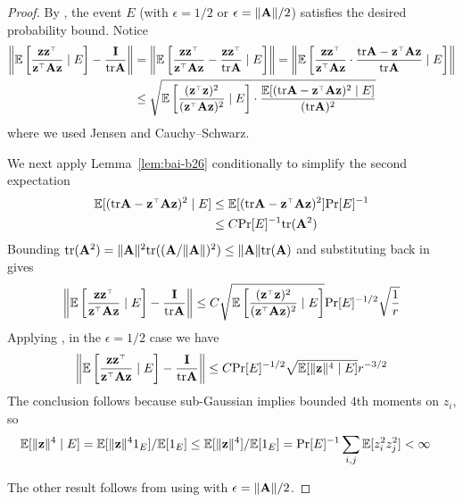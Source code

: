 \begin{proof}
  By , the event $E$
  (with $\epsilon = 1/2$ or $\epsilon = \|\mathbf A\| / 2$) satisfies the desired
  probability bound. Notice
  \begin{align*}
    \left\| \E \left[
      \frac{\z \z^\top}{\z^\top \A \z}
    \mid E \right] - \frac{\I}{\tr \A} \right\|
    &= \left\| \E \left[
      \frac{\z \z^\top}{\z^\top \A \z} - \frac{\z \z^\top}{\tr \A}
    \mid E \right] \right\|
    = \left\| \E \left[
      \frac{\z \z^\top}{\z^\top \A \z} \cdot \frac{ \tr \A - \z^\top \A \z }{\tr \A}
    \mid E \right] \right\| \\
    &\le \sqrt{\E \left[
      \frac{ (\z^\top \z)^2 }{ (\z^\top \A \z)^2 }
  \mid E \right] \cdot \frac{ \E[(\tr \A - \z^\top \A \z)^2 \mid E]}{(\tr \A)^2} } \\
  \end{align*}
  where we used Jensen and Cauchy–Schwarz.

  We next apply Lemma~\ref{lem:bai-b26} conditionally
  to simplify the second expectation
  \begin{align*}
    \E[(\tr \A - \z^\top \A \z)^2  \mid E]
    &\leq \E[(\tr \A - \z^\top \A \z)^2] \Pr[E]^{-1} \\
    &\leq C \Pr[E]^{-1} \tr(\A^2)
  \end{align*}
  Bounding $\mathrm{tr}(\mathbf A^2) = \|\mathbf A\|^2 \mathrm{tr}((\mathbf A / \|\mathbf A\|)^2) \leq \|\mathbf A\| \mathrm{tr}(\mathbf A)$
  and substituting back in gives
  \[
    \left\| \E \left[
      \frac{\z \z^\top}{\z^\top \A \z}
    \mid E \right] - \frac{\I}{\tr \A} \right\|
    \le C \sqrt{\E \left[
      \frac{ (\z^\top \z)^2 }{ (\z^\top \A \z)^2 }
    \mid E \right]} \Pr[E]^{-1/2} \sqrt{\frac{1}{r}}
  \]
  Applying , in the $\epsilon = 1/2$ case
  we have
  \[
    \left\| \E \left[
      \frac{\z \z^\top}{\z^\top \A \z} \mid E
    \right] - \frac{\I}{\tr \A} \right\|
    \le C \Pr[E]^{-1/2} \sqrt{\E[\|\z\|^4 \mid E]} r^{-3/2}
  \]
  The conclusion follows because sub-Gaussian implies bounded $4$th moments on
  $z_i$, so
  \begin{align*}
    \mathbb E[\|\mathbf z\|^4 \mid E]
    &= \mathbb E[\|\mathbf z\|^4 1_{E}] / \mathbb E[1_E]
    \leq \mathbb E[\|\mathbf z\|^4] / \mathbb E[1_E]
    = \mathrm{Pr}[E]^{-1} \sum_{i,j} \mathbb E[z_i^2 z_j^2]
    < \infty
  \end{align*}

  The other result follows from using
   with $\epsilon = \|\mathbf A\| / 2$.
\end{proof}

